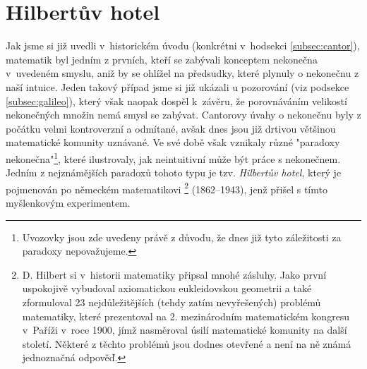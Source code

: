\section{Hilbertův hotel}\label{sec:hilbertuv_hotel}
Jak jsme si již uvedli v~historickém úvodu (konkrétni v~hodsekci \ref{subsec:cantor}), matematik  byl jedním z prvních, kteří se zabývali konceptem nekonečna v~uvedeném smyslu, aniž by se ohlížel na předsudky, které plynuly o nekonečnu z naší intuice. Jeden takový případ jsme si již ukázali u pozorování  (viz podsekce \ref{subsec:galileo}), který však naopak dospěl k~závěru, že porovnáváním velikostí nekonečných množin nemá smysl se zabývat. Cantorovy úvahy o nekonečnu byly z počátku velmi kontroverzní a odmítané, avšak dnes jsou již drtivou většinou matematické komunity uznávané. Ve své době však vznikaly různé "paradoxy nekonečna"\footnote{Uvozovky jsou zde uvedeny právě z důvodu, že dnes již tyto záležitosti za paradoxy nepovažujeme.}, které ilustrovaly, jak neintuitivní může být práce s nekonečnem. Jedním z nejznámějších paradoxů tohoto typu je tzv. \emph{Hilbertův hotel}, který je pojmenován po německém matematikovi \footnote{D. Hilbert si v~historii matematiky připsal mnohé zásluhy. Jako první uspokojivě vybudoval axiomatickou eukleidovskou geometrii a také zformuloval 23 nejdůležitějších (tehdy zatím nevyřešených) problémů matematiky, které prezentoval na 2. mezinárodním matematickém kongresu v~Paříži v~roce 1900, jímž nasměroval úsilí matematické komunity na další století. Některé z těchto problémů jsou dodnes otevřené a není na ně známá jednoznačná odpověď.} (1862--1943), jenž přišel s tímto myšlenkovým experimentem.
\medskip

